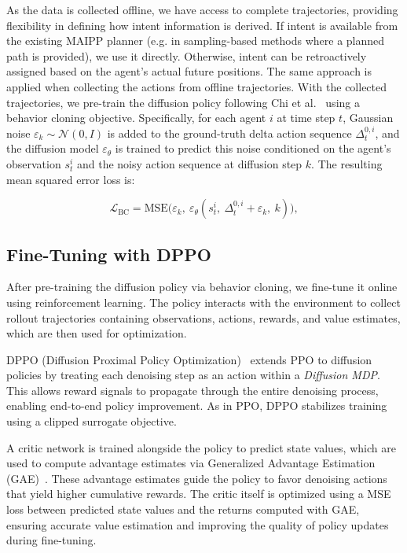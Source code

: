 \documentclass[runningheads]{llncs}
\begin{document}
As the data is collected offline, we have access to complete trajectories, providing flexibility in defining how intent information is derived. If intent is available from the existing MAIPP planner (e.g. in sampling-based methods where a planned path is provided), we use it directly. Otherwise, intent can be retroactively assigned based on the agent's actual future positions. The same approach is applied when collecting the actions from offline trajectories. 
With the collected trajectories, we pre-train the diffusion policy following Chi et al.~\cite{chi2024diffusionpolicy} using a behavior cloning objective. Specifically, for each agent $i$ at time step $t$, Gaussian noise $\varepsilon_k \sim \mathcal{N}(0, I)$ is added to the ground-truth delta action sequence $\Delta_t^{0,i}$, and the diffusion model $\varepsilon_\theta$ is trained to predict this noise conditioned on the agent’s observation $s_t^i$ and the noisy action sequence at diffusion step $k$. The resulting mean squared error loss is:

\begin{equation}
\mathcal{L}_{\text{BC}} = \text{MSE}\Big(\varepsilon_k, \ \varepsilon_\theta(s_t^i, \ \Delta_t^{0,i} + \varepsilon_k, \ k)\Big),
\end{equation}

\subsection{Fine-Tuning with DPPO}
After pre-training the diffusion policy via behavior cloning, we fine-tune it online using reinforcement learning. The policy interacts with the environment to collect rollout trajectories containing observations, actions, rewards, and value estimates, which are then used for optimization.

DPPO (Diffusion Proximal Policy Optimization)~\cite{dppo2024} extends PPO to diffusion policies by treating each denoising step as an action within a \textit{Diffusion MDP}. This allows reward signals to propagate through the entire denoising process, enabling end-to-end policy improvement. As in PPO, DPPO stabilizes training using a clipped surrogate objective.

A critic network is trained alongside the policy to predict state values, which are used to compute advantage estimates via Generalized Advantage Estimation (GAE)~\cite{DBLP:journals/corr/SchulmanMLJA15}. These advantage estimates guide the policy to favor denoising actions that yield higher cumulative rewards. The critic itself is optimized using a MSE loss between predicted state values and the returns computed with GAE, ensuring accurate value estimation and improving the quality of policy updates during fine-tuning.
\end{document}

